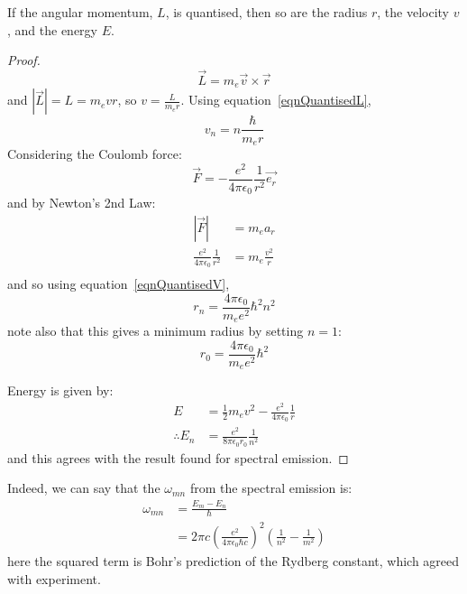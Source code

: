 \documentclass[../Main.tex]{subfiles}
\begin{document}
\begin{theorem}
    If the angular momentum, $L$, is quantised, then so are the radius $r$, the velocity $v$, and the energy $E$.
    \label{thmQuantisation}
\end{theorem}
\begin{proof}
    \begin{equation*}
        \vec{L} = m_e \vec{v} \times \vec{r}
    \end{equation*}
    and $|\vec{L}| = L = m_e v r$, so $v = \frac{L}{m_e r}$. Using equation~\ref{eqnQuantisedL},
    \begin{equation}
        v_n = n \frac{\hbar}{m_e r}
        \label{eqnQuantisedV}
    \end{equation}
    Considering the Coulomb force:
    \begin{equation*}
        \vec{F} = -\frac{e^2}{4\pi \epsilon_0} \frac{1}{r^2} \vec{e_r}
    \end{equation*}
    and by Newton's 2nd Law:
    \begin{align*}
        |\vec{F}| &= m_e a_r \\
        \frac{e^2}{4\pi\epsilon_0} \frac{1}{r^2} &= m_e \frac{v^2}{r} \\
    \end{align*}
    and so using equation~\ref{eqnQuantisedV},
    \begin{equation}
        r_n = \frac{4\pi\epsilon_0}{m_e e^2} \hbar^2 n^2
        \label{eqnQuantisedR}
    \end{equation}
    note also that this gives a minimum radius by setting $n = 1$:
    \begin{equation*}
        r_0 = \frac{4\pi\epsilon_0}{m_e e^2}\hbar^2
    \end{equation*}
    
    Energy is given by:
    \begin{align*}
        E &= \frac12 m_e v^2 - \frac{e^2}{4\pi\epsilon_0} \frac{1}{r} \\
        \therefore E_n &= \frac{e^2}{8\pi\epsilon_0r_0} \frac{1}{n^2}
    \end{align*}
    and this agrees with the result found for spectral emission.
\end{proof}
\begin{remark}
    Indeed, we can say that the $\omega_{mn}$ from the spectral emission is:
    \begin{align*}
        \omega_{mn} &= \frac{E_m - E_n}{\hbar} \\
        &= 2\pi c \left(\frac{e^2}{4\pi \epsilon_0 \hbar c}\right)^2 \left(\frac{1}{n^2} - \frac{1}{m^2}\right)
    \end{align*}
    here the squared term is Bohr's prediction of the Rydberg constant, which agreed with experiment.
\end{remark}
\end{document}
